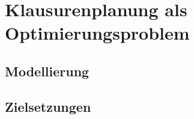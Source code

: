 \newpage
\section{Klausurenplanung als Optimierungsproblem}
\subsection{Modellierung}
\subsection{Zielsetzungen}